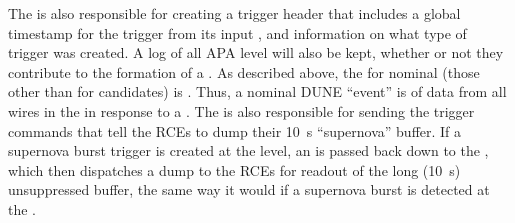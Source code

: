 	
The  is also responsible for creating a trigger header that
includes a global timestamp for the trigger from its input
, and information on what type of trigger was
created. 
A log of all APA level  will also be kept,
whether or not they contribute to the formation of a
. 
As described above, the  for nominal
 (those other than for  candidates) is
\readout.
Thus, a nominal DUNE ``event'' is \readout of data from all wires
in the   in response to a 
. 
The  is also responsible for sending the trigger commands
that tell the RCEs to dump their \SI{10}{\s} ``supernova'' buffer. 
If a supernova burst trigger is created at the  level, an
 is passed back down to the , which
then dispatches a dump  to the RCEs for readout of
the long (\SI{10}{\s}) unsuppressed buffer, the same way it would if a
supernova burst is detected at the .


	


%

%
%
%
